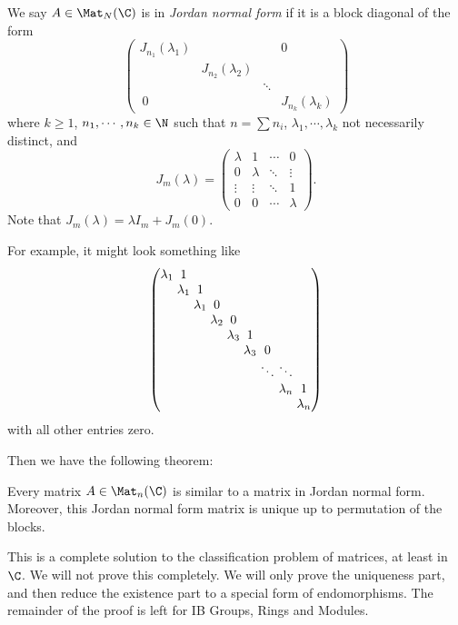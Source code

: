 \documentclass[a4paper]{article}
\begin{document}
\begin{defi}
  We say $A \in \Mat_N(\C)$ is in \emph{Jordan normal form} if it is a block diagonal of the form
  \[
    \begin{pmatrix}
      J_{n_1}(\lambda_1) & & & 0\\
      & J_{n_2}(\lambda_2)\\
      & & \ddots\\\
      0 & & & J_{n_k} (\lambda_k)
    \end{pmatrix}
  \]
  where $k \geq 1$, $n_1, \cdots, n_k \in \N$ such that $n = \sum n_i$, $\lambda_1, \cdots, \lambda_k$ not necessarily distinct, and
  \[
    J_m (\lambda) =
    \begin{pmatrix}
      \lambda & 1 & \cdots & 0\\
      0 & \lambda & \ddots & \vdots\\
      \vdots & \vdots & \ddots & 1\\
      0 & 0 & \cdots & \lambda
    \end{pmatrix}.
  \]
  Note that $J_m(\lambda) = \lambda I_m + J_m(0)$.
\end{defi}
For example, it might look something like
\[\arraycolsep=1.4pt
  \begin{pmatrix}
    \lambda_1 & 1\\
    & \lambda_1 & 1\\
    & & \lambda_1 & 0\\
    & & & \lambda_2 & 0\\
    & & & & \lambda_3 & 1\\
    & & & & & \lambda_3 & 0\\
    & & & & & & \ddots & \ddots\\
    & & & & & & & \lambda_n & 1\\
    & & & & & & & & \lambda_n
  \end{pmatrix}
\]
with all other entries zero.

Then we have the following theorem:
\begin{thm}
  Every matrix $A \in \Mat_n(\C)$ is similar to a matrix in Jordan normal form. Moreover, this Jordan normal form matrix is unique up to permutation of the blocks.
\end{thm}
This is a complete solution to the classification problem of matrices, at least in $\C$. We will not prove this completely. We will only prove the uniqueness part, and then reduce the existence part to a special form of endomorphisms. The remainder of the proof is left for IB Groups, Rings and Modules.
\end{document}
